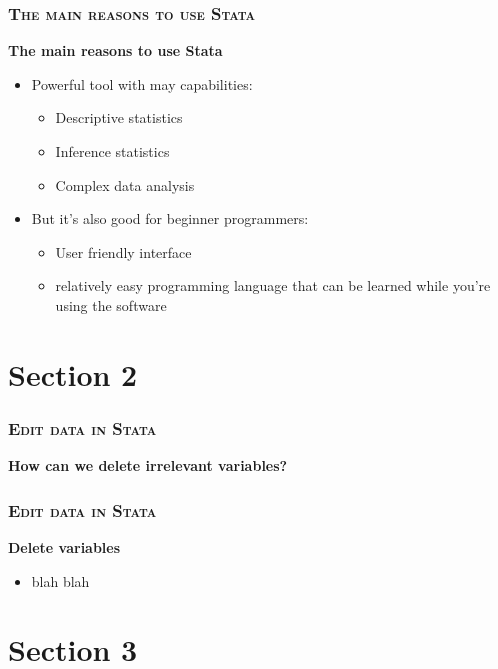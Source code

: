 \documentclass[10pt]{beamer}
\begin{document}
	\begin{frame}
		\frametitle{\textsc{The main reasons to use Stata}}
		\begin{center}
			\Large\textbf{The main reasons to use Stata}
		\end{center}
		\begin{itemize}
			\item Powerful tool with may capabilities:
			
			\begin{itemize}
				\item Descriptive statistics
				
				\item Inference statistics
				
				\item Complex data analysis
				
			\end{itemize}
			
			\item But it’s also good for beginner programmers:
			
			\begin{itemize}
				\item User friendly interface
				
				\item relatively easy programming language that can be learned while you’re using the software
				
			\end{itemize}
		\end{itemize}
	\end{frame}	



\section{Section 2}

	\begin{frame}
		\frametitle{\textsc{Edit data in Stata}}
		\begin{center}
			\textbf{How can we delete irrelevant variables?}
		\end{center}
	\end{frame}

	\begin{frame}[fragile]
		\frametitle{\textsc{Edit data in Stata}}
		\begin{center}
		\Large\textbf{Delete variables}
		\end{center}
		\begin{itemize}
		\item blah blah
		\end{itemize}
		\begin{stlog}\end{stlog}

\begin{stlog}\end{stlog}
	\end{frame}


	\section{Section 3}

	
\end{document}

